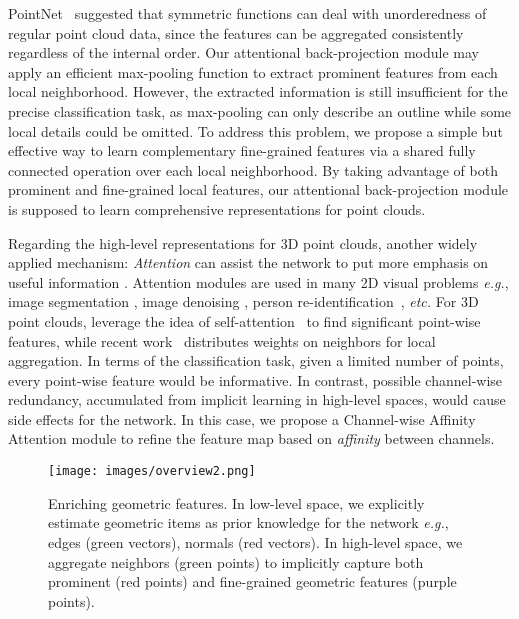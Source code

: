 \documentclass[journal,twoside]{IEEEtran}
\newcommand{\latinphrase}[1]{\textit{#1}}
\newcommand{\eg}{\latinphrase{e.g.}\xspace}
\newcommand{\etc}{\latinphrase{etc.}\xspace}
\begin{document}
PointNet~\cite{qi2017pointnet} suggested that symmetric functions can deal with unorderedness of regular point cloud data, since the features can be aggregated consistently regardless of the internal order. Our attentional back-projection module may apply an efficient max-pooling function to extract prominent features from each local neighborhood. However, the extracted information is still insufficient for the precise classification task, as max-pooling can only describe an outline while some local details could be omitted. To address this problem, we propose a simple but effective way to learn complementary fine-grained features via a shared fully connected operation over each local neighborhood. By taking advantage of both prominent and fine-grained local features, our attentional back-projection module is supposed to learn comprehensive representations for point clouds.

Regarding the high-level representations for 3D point clouds, another widely applied mechanism: \emph{Attention} can assist the network to put more emphasis on useful information \cite{vaswani2017attention}. Attention modules are used in many 2D visual problems \eg, image segmentation \cite{wang2018non,hu2018squeeze,fu2019dual, Fang_2019_ICCV}, image denoising \cite{Anwar_2019_ICCV}, person re-identification~\cite{Fang_2019_ICCV}, \etc For 3D point clouds, \cite{xie2018attentional, feng2019point, liu2019l2g} leverage the idea of self-attention~\cite{vaswani2017attention} to find significant point-wise features, while recent work~\cite{Hu_2020_CVPR} distributes weights on neighbors for local aggregation. In terms of the classification task, given a limited number of points, every point-wise feature would be informative. In contrast, possible channel-wise redundancy, accumulated from implicit learning in high-level spaces, would cause side effects for the network. In this case, we propose a Channel-wise Affinity Attention module to refine the feature map based on \emph{affinity} between channels.
\begin{figure}
\begin{center}
\texttt{[image: images/overview2.png]}
\end{center}
   \caption{Enriching geometric features. In low-level space, we explicitly estimate geometric items as prior knowledge for the network \eg, edges (green vectors), normals (red vectors). In high-level space, we aggregate neighbors (green points) to implicitly capture both prominent (red points) and fine-grained geometric features (purple points).}
\label{fig:overview}
\end{figure}
\end{document}
